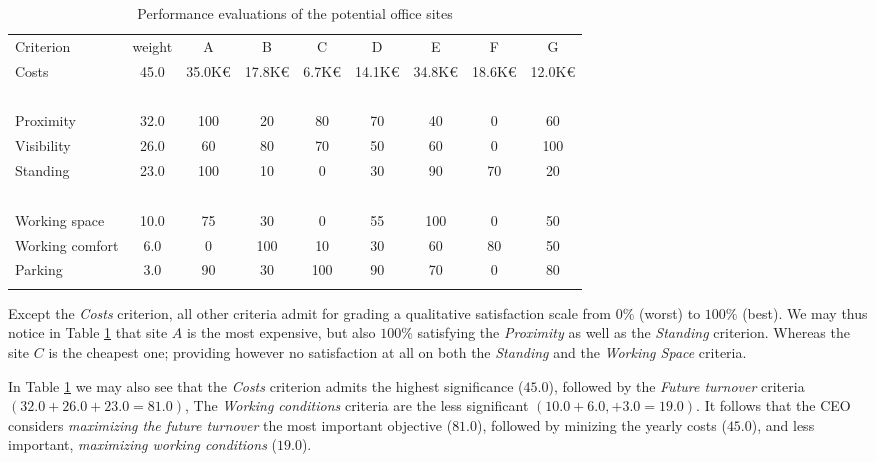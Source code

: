 \begin{table}[h]
\caption{Performance evaluations of the potential office sites}
\label{tab:6.3}       %
\begin{center}
    \begin{tabular}{l|c|c|c|c|c|c|c|c}
      \hline\noalign{\smallskip}
    Criterion  &   weight &  A  &      B &       C &       D &       E &        F &        G\\
       \noalign{\smallskip}\hline\noalign{\smallskip}

    Costs     &    45.0  &   35.0K€ &  17.8K€  & 6.7K€  &  14.1K€ &  34.8K€ &  18.6K€ &  12.0K€\\
    \      &        \    &   \      &  \     &   \     &   \    &    \    &    \    &    \ \\
    Proximity     &     32.0  &   100    &  20 &      80    &   70    &   40    &   0    &    60 \\
    Visibility     &     26.0  &   60     &  80  &     70    &   50    &   60    &   0    &    100 \\
    Standing     &     23.0  &   100   &   10   &    0     &   30    &   90    &   70   &    20 \\
    \        &      \    &   \     &   \    &    \     &   \     &   \     &   \    &    \  \\
    Working space     &     10.0  &   75    &   30   &    0     &   55    &   100   &   0    &    50  \\
    Working comfort     &      6.0  &   0     &   100  &    10    &   30    &   60    &   80   &    50 \\
    Parking     &      3.0  &   90    &   30   &    100   &   90    &   70    &   0    &    80 \\
      \noalign{\smallskip}\hline
    \end{tabular}
  \end{center}
\end{table}

Except the \emph{Costs} criterion, all other criteria admit for grading a qualitative satisfaction scale from $0\%$ (worst) to $100\%$ (best). We may thus notice in Table \ref{tab:6.3} that site $A$ is the most expensive, but also $100\%$ satisfying the \emph{Proximity} as well as the  \emph{Standing} criterion. Whereas the site $C$ is the cheapest one; providing however no satisfaction at all on both the \emph{Standing} and the \emph{Working Space} criteria.

In Table \ref{tab:6.3} we may also see that the \emph{Costs} criterion admits the highest significance ($45.0$), followed by the \emph{Future turnover} criteria $(32.0 + 26.0 + 23.0 = 81.0)$, The \emph{Working conditions} criteria are the less significant $(10.0 + 6.0, + 3.0 = 19.0)$. It follows that the CEO considers \emph{maximizing the future turnover} the most important objective ($81.0$), followed by minizing the yearly costs ($45.0$), and less important, \emph{maximizing working conditions} ($19.0$). 

